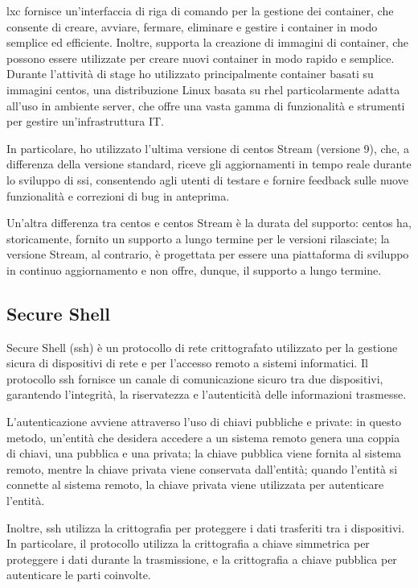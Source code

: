 \acrshort{lxc} fornisce un'interfaccia di riga di comando per la gestione dei container, che consente di creare, avviare, fermare, eliminare e gestire i container in modo semplice ed efficiente. Inoltre, supporta la creazione di immagini di container, che possono essere utilizzate per creare nuovi container in modo rapido e semplice.
\\
Durante l'attività di stage ho utilizzato principalmente container basati su immagini \acrshort{centos}, una distribuzione Linux basata su \acrshort{rhel} particolarmente adatta all'uso in ambiente server, che offre una vasta gamma di funzionalità e strumenti per gestire un'infrastruttura IT. 

In particolare, ho utilizzato l'ultima versione di \acrshort{centos} Stream (versione 9), che, a differenza della versione standard, riceve gli aggiornamenti in tempo reale durante lo sviluppo di \acrshort{ssi}, consentendo agli utenti di testare e fornire feedback sulle nuove funzionalità e correzioni di bug in anteprima\cite{site:centos-stream}.

Un'altra differenza tra \acrshort{centos} e \acrshort{centos} Stream è la durata del supporto: \acrshort{centos} ha, storicamente, fornito un supporto a lungo termine per le versioni rilasciate; la versione Stream, al contrario, è progettata per essere una piattaforma di sviluppo in continuo aggiornamento e non offre, dunque, il supporto a lungo termine.

\subsection{Secure Shell}
Secure Shell (\acrshort{ssh}) è un protocollo di rete crittografato utilizzato per la gestione sicura di dispositivi di rete e per l'accesso remoto a sistemi informatici. Il protocollo \acrshort{ssh} fornisce un canale di comunicazione sicuro tra due dispositivi, garantendo l'integrità, la riservatezza e l'autenticità delle informazioni trasmesse.

L'autenticazione avviene attraverso l'uso di chiavi pubbliche e private: in questo metodo, un'entità che desidera accedere a un sistema remoto genera una coppia di chiavi, una pubblica e una privata; la chiave pubblica viene fornita al sistema remoto, mentre la chiave privata viene conservata dall'entità; quando l'entità si connette al sistema remoto, la chiave privata viene utilizzata per autenticare l'entità.

Inoltre, \acrshort{ssh} utilizza la crittografia per proteggere i dati trasferiti tra i dispositivi. In particolare, il protocollo utilizza la crittografia a chiave simmetrica per proteggere i dati durante la trasmissione, e la crittografia a chiave pubblica per autenticare le parti coinvolte.

